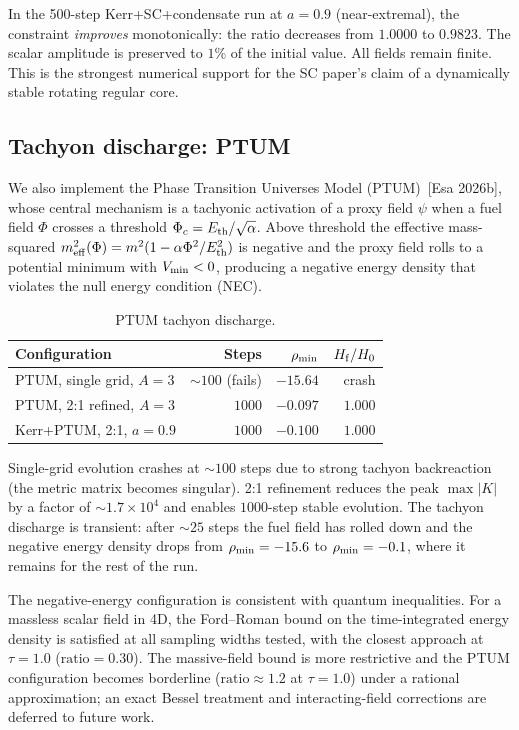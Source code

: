 In the 500-step Kerr+SC+condensate run at $a = 0.9$ (near-extremal),
the constraint \emph{improves} monotonically: the ratio decreases
from $1.0000$ to $0.9823$. The scalar amplitude is preserved to
$1\%$ of the initial value. All fields remain finite. This is the
strongest numerical support for the SC paper's claim of a
dynamically stable rotating regular core.

\subsection{Tachyon discharge: PTUM}

We also implement the Phase Transition Universes Model (PTUM)~[Esa
2026b], whose central mechanism is a tachyonic activation of a proxy
field $\psi$ when a fuel field $\Phi$ crosses a threshold
$\Phi_c = E_{\rm th}/\sqrt{\alpha}$. Above threshold the effective
mass-squared $m_{\rm eff}^2(\Phi) = m^2(1 - \alpha\Phi^2/E_{\rm th}^2)$
is negative and the proxy field rolls to a potential minimum with
$V_{\rm min} < 0$, producing a negative energy density that violates
the null energy condition (NEC).

\begin{table}[t]
\centering
\caption{PTUM tachyon discharge.}
\label{tab:ptum}
\begin{tabular}{lrrr}
\hline
Configuration & Steps & $\rho_{\rm min}$ & $H_{\rm f}/H_0$ \\
\hline
PTUM, single grid, $A{=}3$   &  $\sim 100$ (fails) & $-15.64$ & crash \\
PTUM, 2:1 refined, $A{=}3$   &  $1000$ & $-0.097$ & $1.000$ \\
Kerr+PTUM, 2:1, $a{=}0.9$    &  $1000$ & $-0.100$ & $1.000$ \\
\hline
\end{tabular}
\end{table}

Single-grid evolution crashes at $\sim 100$ steps due to strong
tachyon backreaction (the metric matrix becomes singular). 2:1
refinement reduces the peak $\max|K|$ by a factor of $\sim 1.7\times
10^4$ and enables $1000$-step stable evolution. The tachyon discharge
is transient: after $\sim 25$ steps the fuel field has rolled down and
the negative energy density drops from $\rho_{\rm min} = -15.6$ to
$\rho_{\rm min} = -0.1$, where it remains for the rest of the run.

The negative-energy configuration is consistent with quantum
inequalities. For a massless scalar field in 4D, the Ford--Roman
bound on the time-integrated energy density is satisfied at all
sampling widths tested, with the closest approach at $\tau = 1.0$
($\text{ratio} = 0.30$). The massive-field bound is more restrictive
and the PTUM configuration becomes borderline ($\text{ratio} \approx
1.2$ at $\tau = 1.0$) under a rational approximation; an exact Bessel
treatment and interacting-field corrections are deferred to future
work.


